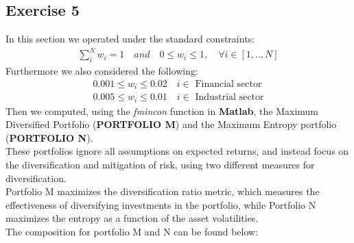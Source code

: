 \documentclass{assignment}
\begin{document}
\subsection*{Exercise 5}
In this section we operated under the standard constraints:
\begin{align*}
    \sum_i^N w_{i} = 1 \quad and \quad
    0\leq w_i \leq 1 ,\quad  \forall i\in \left [ 1,..,N \right ]  
\end{align*}
Furthermore we also considered the following:
\begin{align*}
    0.001 \leq w_i \leq 0.02 \quad i \in \text{ Financial sector} \\
    0.005 \leq w_i \leq 0.01 \quad i \in \text{ Industrial sector}
\end{align*}
Then we computed, using the \textit{fmincon} function in \textbf{Matlab}, the Maximum Diversified Portfolio (\textbf{PORTFOLIO M}) and the Maximum Entropy portfolio (\textbf{PORTFOLIO N}). \\
These portfolios ignore all assumptions on expected returns, and instead focus on the diversification and mitigation of risk, using two different measures for diversification.\\
Portfolio M maximizes the diversification ratio metric, which measures the effectiveness of diversifying investments in the portfolio, while Portfolio N maximizes the entropy as a function of the asset volatilities.\\
The composition for portfolio M and N can be found below:
\end{document}
